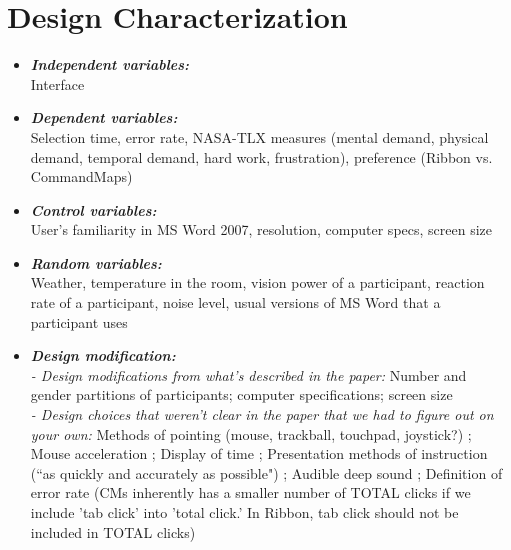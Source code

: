 \documentclass{article}
\begin{document}
\section*{Design Characterization}  
\begin{itemize}
   \item \textbf{\textit{Independent variables:}} \\
   Interface 
    \item \textbf{\textit{Dependent variables:}}\\
    Selection time, error rate, NASA-TLX measures (mental demand, physical demand, temporal demand, hard work, frustration), preference (Ribbon vs. CommandMaps)
    \item \textbf{\textit{Control variables:}} \\
   User's familiarity in MS Word 2007, resolution, computer specs, screen size
   \item \textbf{\textit{Random variables:}} \\
   Weather, temperature in the room, vision power of a participant, reaction rate of a participant, noise level, usual versions of MS Word that a participant uses
   \item \textbf{\textit{Design modification:}} \\
   \textit{- Design modifications from what's described in the paper:}
   Number and gender partitions of participants; computer specifications; screen size
   \\
   \textit{- Design choices that weren't clear in the paper that we had to figure out on your own:}
   Methods of pointing (mouse, trackball, touchpad, joystick?) 
;	Mouse acceleration
;	Display of time 
;	Presentation methods of instruction (``as quickly and accurately as possible")
;	Audible deep sound
;	Definition of error rate (CMs inherently has a smaller number of TOTAL clicks if we include 'tab click' into 'total click.' In Ribbon, tab click should not be included in TOTAL clicks) 

   \end{itemize}
\end{document}
